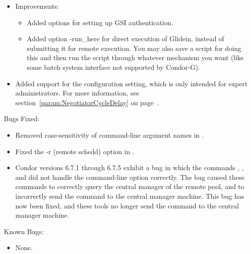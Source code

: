 \begin{itemize}
\begin{itemize}
\end{itemize}

\item {} Improvements:

\begin{itemize}

  \item Added  options for setting up GSI authentication.

  \item Added  option {-run\_here} for direct
  execution of Glidein, instead of submitting it for remote execution.
  You may also save a script for doing this and then run the script
  through whatever mechanism you want (like some batch system
  interface not supported by Condor-G).

\end{itemize}

\item Added support for the 
  configuration setting, which is only intended for expert
  administrators.
  For more information, see section~\ref{param:NegotiatorCycleDelay}
  on page~\pageref{param:NegotiatorCycleDelay}.


\end{itemize}

\noindent Bugs Fixed:

\begin{itemize}

\item Removed case-sensitivity of command-line argument names in
.

\item Fixed the {-r} (remote schedd) option in .

\item Condor versions 6.7.1 through 6.7.5 exhibit a bug in
  which the commands , , and
   did not handle the  command-line option
  correctly.
  The bug caused these commands to correctly query the central manager
  of the remote pool,
  and to incorrectly send the command to the central manager machine.
  This bug has now been fixed, and these tools no longer send
  the command to the central manager machine.

\end{itemize}

\noindent Known Bugs:

\begin{itemize}

\item None.

\end{itemize}


